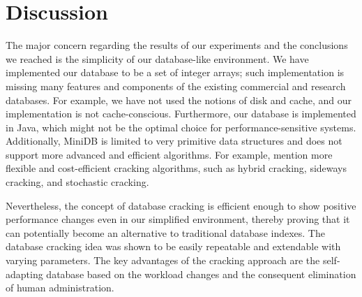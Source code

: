\section{Discussion}
\indent The major concern regarding the results of our experiments and the conclusions we reached is the simplicity of our database-like environment. We have implemented our database to be a set of integer arrays; such implementation is missing many features and components of the existing commercial and research databases. For example, we have not used the notions of disk and cache, and our implementation is not cache-conscious.  Furthermore, our database is implemented in Java, which might not be the optimal choice for performance-sensitive systems. Additionally, MiniDB is limited to very primitive data structures and does not support more advanced and efficient algorithms. For example, \cite{schuhknecht_2014} mention more flexible and cost-efficient cracking algorithms, such as hybrid cracking, sideways cracking, and stochastic cracking.

Nevertheless, the concept of database cracking is efficient enough to show positive performance changes even in our simplified environment, thereby proving that it can potentially become an alternative to traditional database indexes. The database cracking idea was shown to be easily repeatable and extendable with varying parameters. The key advantages of the cracking approach are the self-adapting database based on the workload changes and the consequent elimination of human administration.
\label{sec:discussion}
